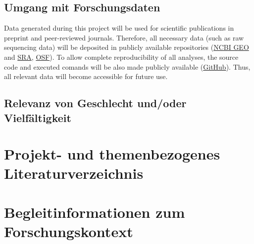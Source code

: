 \documentclass[ngerman]{scrartcl}
\begin{document}
\subsection{Umgang mit Forschungsdaten}
Data generated during this project will be used for scientific publications in
preprint and peer-reviewed journals. Therefore, all necessary data (such as raw
sequencing data) will be deposited in publicly available repositories
(\href{https://www.ncbi.nlm.nih.gov/geo/}{NCBI GEO} and
\href{https://www.ncbi.nlm.nih.gov/sra}{SRA}, \href{https://osf.io/}{OSF}). To
allow complete reproducibility of all analyses, the source code and executed
comands will be also made publicly available
(\href{https://github.com/}{GitHub}).  Thus, all relevant data will become
accessible for future use. 

\subsection{Relevanz von Geschlecht und/oder Vielfältigkeit}

\section{Projekt- und themenbezogenes Literaturverzeichnis}
\label{sec:bib}
\newrefcontext[labelprefix= ]
\printbibliography[notcategory=reviewed, notcategory=nonreviewed, notcategory=patents_pending, notcategory=patents, heading=none, env=bibliographyNUM]


\backmatter
\section{Begleitinformationen zum Forschungskontext}
\end{document}

